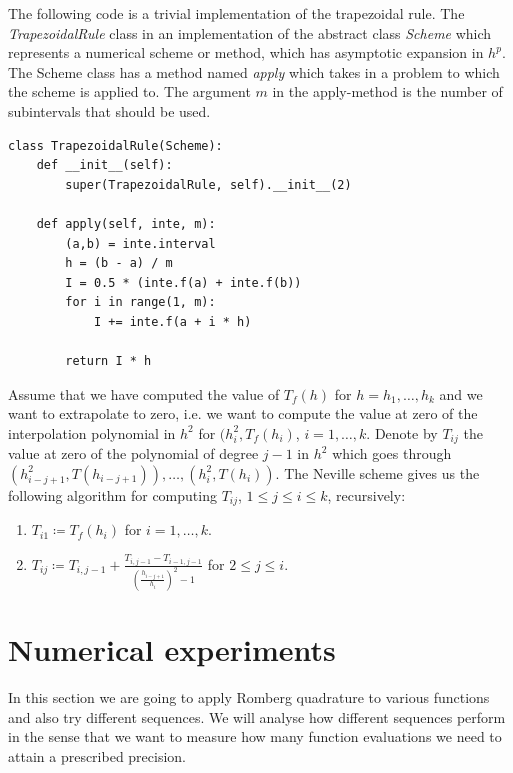 The following code is a trivial implementation of the trapezoidal rule. The {\it TrapezoidalRule} class in an implementation of the abstract class {\it Scheme} which represents a numerical scheme or method, which has asymptotic expansion in \(h^p\). The Scheme class has a method named {\it apply} which takes in a problem to which the scheme is applied to. The argument \(m\) in the apply-method is the number of subintervals that should be used.

\begin{verbatim}
class TrapezoidalRule(Scheme):
    def __init__(self):
        super(TrapezoidalRule, self).__init__(2)

    def apply(self, inte, m):
        (a,b) = inte.interval
        h = (b - a) / m
        I = 0.5 * (inte.f(a) + inte.f(b))
        for i in range(1, m):
            I += inte.f(a + i * h)

        return I * h
\end{verbatim}

Assume that we have computed the value of \(T_f(h)\) for \(h = h_1,\ldots,h_k\) and we want to extrapolate to zero, i.e. we want to compute the value at zero of the interpolation polynomial in \(h^2\) for \((h_i^2,T_f(h_i)\), \(i=1,\ldots,k\). Denote by \(T_{ij}\) the value at zero of the polynomial of degree \(j-1\) in \(h^2\) which goes through \((h_{i-j+1}^2, T(h_{i-j+1})),\ldots,(h_i^2,T(h_i))\). The Neville scheme gives us the following algorithm for computing \(T_{ij}\), \(1\leq j\leq i\leq k\), recursively:

\begin{enumerate}
    \item \(T_{i1} \coloneqq T_f(h_i)\) for \(i = 1,\ldots,k\).
    \item \(T_{ij} \coloneqq T_{i,j-1} + \frac{T_{i,j-1} - T_{i-1,j-1}}{\left(\frac{h_{i-j+1}}{h_i}\right)^2 - 1}\) for \(2\leq j\leq i\).
\end{enumerate}

\section{Numerical experiments}

In this section we are going to apply Romberg quadrature to various functions and also try different sequences. We will analyse how different sequences perform in the sense that we want to measure how many function evaluations we need to attain a prescribed precision.\\

